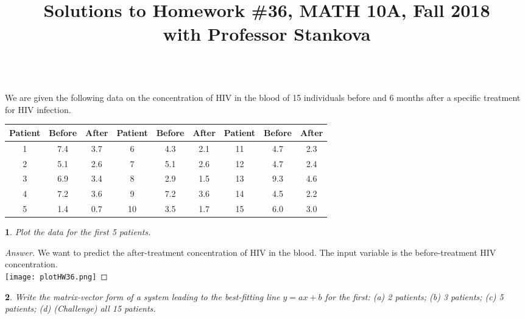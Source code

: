 \documentclass [11pt, letterpaper] {amsart}
\title{Solutions to Homework \#36, MATH 10A, Fall 2018\\ with Professor Stankova
}
\theoremstyle{plain}
\newtheorem{exer}{}
\theoremstyle{definition}
\begin{document}
\maketitle

\vspace{0.05in}
\\
We are given the following data on the concentration of HIV in the blood of 15 individuals before and 6 months after a specific treatment for HIV infection.

\smallskip
{\small\begin{center}\begin{tabular}{|c|c|c||c|c|c||c|c|c|}\hline
Patient&Before&After&Patient&Before&After&Patient&Before&After\\\hline
1&7.4&3.7&6&4.3&2.1&11&4.7&2.3\\\hline
2&5.1&2.6&7&5.1&2.6&12&4.7&2.4\\\hline
3&6.9&3.4&8&2.9&1.5&13&9.3&4.6\\\hline
4&7.2&3.6&9&7.2&3.6&14&4.5&2.2\\\hline
5&1.4&0.7&10&3.5&1.7&15&6.0&3.0\\\hline
\end{tabular}
\end{center}}

\begin{exer}
 Plot the data for the first 5 patients.
\end{exer}

\begin{proof}[Answer]
We want to predict the after-treatment concentration of HIV in the blood. The input variable is the before-treatment HIV concentration.\\
\texttt{[image: plotHW36.png]}
\end{proof}


\vspace{0.05in}



\begin{exer}
Write the matrix-vector form of a system leading to the best-fitting line $y=ax+b$ for the first:  (a) 2 patients; \quad (b) 3 patients; \quad (c) 5 patients; \quad (d) (Challenge) all 15 patients.
\end{exer}
\end{document}
